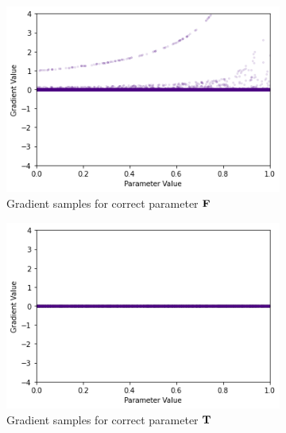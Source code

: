 \begin{figure}[h]
    \centering
    \begin{subfigure}[b]{0.47\textwidth}
        \centering
        \includegraphics[width=\textwidth]{imgs/grad_prod_bce_falseparam_100dim.png}
        \caption{Gradient samples for correct parameter $\textbf{F}$}
        \label{fig:conjgrad100falsebce}
    \end{subfigure}
    \begin{subfigure}[b]{0.47\textwidth}
        \centering
        \includegraphics[width=\textwidth]{imgs/grad_prod_bce_trueparam_100dim.png}
        \caption{Gradient samples for correct parameter $\textbf{T}$}
        \label{fig:conjgrad100truebce}
    \end{subfigure}
    \begin{subfigure}[b]{0.47\textwidth}
        \centering

\end{subfigure}
\end{figure}
